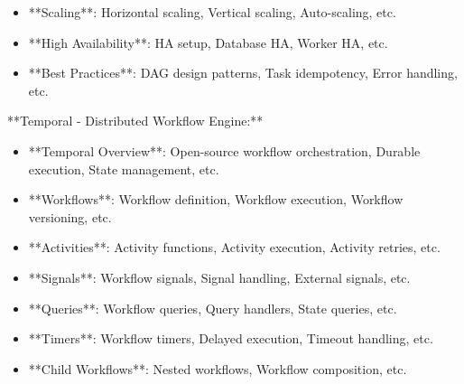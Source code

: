 \documentclass[11pt,a4paper]{article}
\begin{document}
\begin{itemize}
\item **Scaling**: Horizontal scaling, Vertical scaling, Auto-scaling, etc.
\end{itemize}

\begin{itemize}
\item **High Availability**: HA setup, Database HA, Worker HA, etc.
\end{itemize}

\begin{itemize}
\item **Best Practices**: DAG design patterns, Task idempotency, Error handling, etc.
\end{itemize}

**Temporal - Distributed Workflow Engine:**

\begin{itemize}
\item **Temporal Overview**: Open-source workflow orchestration, Durable execution, State management, etc.
\end{itemize}

\begin{itemize}
\item **Workflows**: Workflow definition, Workflow execution, Workflow versioning, etc.
\end{itemize}

\begin{itemize}
\item **Activities**: Activity functions, Activity execution, Activity retries, etc.
\end{itemize}

\begin{itemize}
\item **Signals**: Workflow signals, Signal handling, External signals, etc.
\end{itemize}

\begin{itemize}
\item **Queries**: Workflow queries, Query handlers, State queries, etc.
\end{itemize}

\begin{itemize}
\item **Timers**: Workflow timers, Delayed execution, Timeout handling, etc.
\end{itemize}

\begin{itemize}
\item **Child Workflows**: Nested workflows, Workflow composition, etc.
\end{itemize}
\end{document}
